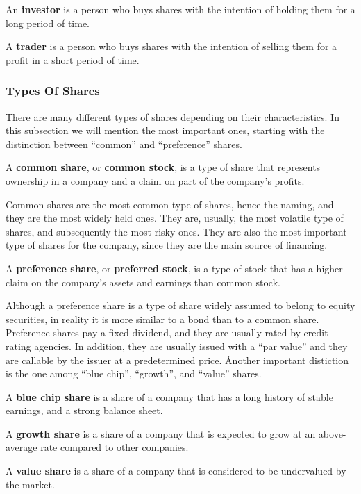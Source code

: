 \bd[Investor]
An \textbf{investor} is a person who buys shares with the intention of holding them for a long period of time.
\ed

\bd[Trader]
A \textbf{trader} is a person who buys shares with the intention of selling them for a profit in a short period of
time.
\ed

\subsubsection{Types Of Shares}

There are many different types of shares depending on their characteristics. In this subsection we will mention the
most important ones, starting with the distinction between ``common'' and ``preference'' shares.

A \textbf{common share}, or \textbf{common stock}, is a type of share that represents ownership in a company and a
claim on part of the company's profits.
\ed

Common shares are the most common type of shares, hence the naming, and they are the most widely held ones. They are,
usually, the most volatile type of shares, and subsequently the most risky ones. They are also the most important type
of shares for the company, since they are the main source of financing.

A \textbf{preference share}, or \textbf{preferred stock}, is a type of stock that has a higher claim on the company's
assets and earnings than common stock.
\ed

Although a preference share is a type of share widely assumed to belong to equity securities, in reality it is more
similar to a bond than to a common share. Preference shares pay a fixed dividend, and they are usually rated by credit
rating agencies. In addition, they are usually issued with a ``par value'' and they are callable by the issuer at a
predetermined price. \v

Another important distiction is the one among ``blue chip'', ``growth'', and ``value'' shares.

A \textbf{blue chip share} is a share of a company that has a long history of stable earnings, and a strong balance
sheet.
\ed

A \textbf{growth share} is a share of a company that is expected to grow at an above-average rate compared to other
companies.
\ed

A \textbf{value share} is a share of a company that is considered to be undervalued by the market.
\ed


